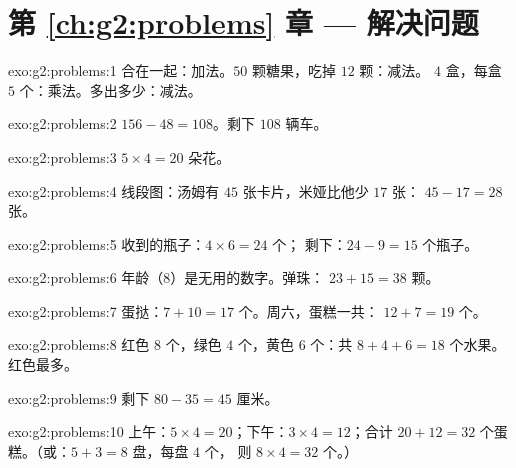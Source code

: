 \section*{第 \ref{ch:g2:problems} 章 --- 解决问题}

\begin{solution}{exo:g2:problems:1}
合在一起：加法。$50$ 颗糖果，吃掉 $12$ 颗：减法。
$4$ 盒，每盒 $5$ 个：乘法。多出多少：减法。
\end{solution}

\begin{solution}{exo:g2:problems:2}
$156 - 48 = 108$。剩下 $108$ 辆车。
\end{solution}

\begin{solution}{exo:g2:problems:3}
$5 \times 4 = 20$ 朵花。
\end{solution}

\begin{solution}{exo:g2:problems:4}
线段图：汤姆有 $45$ 张卡片，米娅比他少 $17$ 张：
$45 - 17 = 28$ 张。
\end{solution}

\begin{solution}{exo:g2:problems:5}
收到的瓶子：$4 \times 6 = 24$ 个；
剩下：$24 - 9 = 15$ 个瓶子。
\end{solution}

\begin{solution}{exo:g2:problems:6}
年龄（$8$）是无用的数字。弹珠：
$23 + 15 = 38$ 颗。
\end{solution}

\begin{solution}{exo:g2:problems:7}
蛋挞：$7 + 10 = 17$ 个。周六，蛋糕一共：
$12 + 7 = 19$ 个。
\end{solution}

\begin{solution}{exo:g2:problems:8}
红色 $8$ 个，绿色 $4$ 个，黄色 $6$ 个：共 $8 + 4 + 6 = 18$ 个水果。
红色最多。
\end{solution}

\begin{solution}{exo:g2:problems:9}
剩下 $80 - 35 = 45$ 厘米。
\end{solution}

\begin{solution}{exo:g2:problems:10}
上午：$5 \times 4 = 20$；下午：$3 \times 4 = 12$；合计
$20 + 12 = 32$ 个蛋糕。（或：$5 + 3 = 8$ 盘，每盘 $4$ 个，
则 $8 \times 4 = 32$ 个。）
\end{solution}
